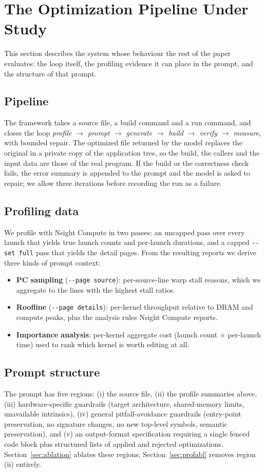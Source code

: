 \section{The Optimization Pipeline Under Study}
\label{sec:subject}
This section describes the system whose behaviour the rest of the paper evaluates: the loop
itself, the profiling evidence it can place in the prompt, and the structure of that prompt.

\subsection{Pipeline}
The framework takes a source file, a build command and a run command, and closes the loop
\emph{profile $\rightarrow$ prompt $\rightarrow$ generate $\rightarrow$ build $\rightarrow$ verify
$\rightarrow$ measure}, with bounded repair. The optimized file returned by the model replaces the
original in a private copy of the application tree, so the build, the callers and the input data are
those of the real program. If the build or the correctness check fails, the error summary is appended
to the prompt and the model is asked to repair; we allow three iterations before recording the run as
a failure.

\subsection{Profiling data}
We profile with Nsight Compute in two passes: an uncapped pass over every launch that yields true
launch counts and per-launch durations, and a capped \texttt{-{}-set full} pass that yields the detail
pages. From the resulting reports we derive three kinds of prompt context:
\begin{itemize}\itemsep2pt
  \item \textbf{PC sampling} (\texttt{-{}-page source}): per-source-line warp stall reasons, which we
    aggregate to the lines with the highest stall ratios.
  \item \textbf{Roofline} (\texttt{-{}-page details}): per-kernel throughput relative to DRAM and compute
    peaks, plus the analysis rules Nsight Compute reports.
  \item \textbf{Importance analysis}: per-kernel aggregate cost (launch count $\times$ per-launch time)
    used to rank which kernel is worth editing at all.
\end{itemize}

\subsection{Prompt structure}
The prompt has five regions: (i) the source file, (ii) the profile summaries above, (iii)
hardware-specific guardrails (target architecture, shared-memory limits, unavailable intrinsics), (iv)
general pitfall-avoidance guardrails (entry-point preservation, no signature changes, no new top-level
symbols, semantic preservation), and (v) an output-format specification requiring a single fenced code
block plus structured lists of applied and rejected optimizations. Section~\ref{sec:ablation} ablates
these regions; Section~\ref{sec:profabl} removes region (ii) entirely.

